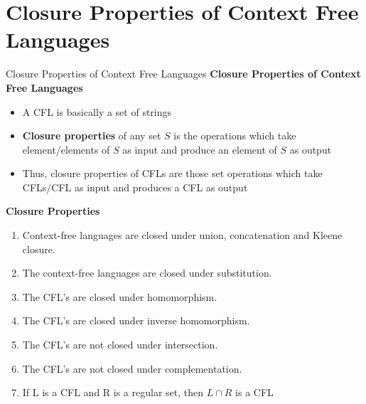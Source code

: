 \documentclass{beamer}
\begin{document}
		
\section{Closure Properties of Context Free Languages}
\begin{frame}{Closure Properties of Context Free Languages}
\textbf{Closure Properties of Context Free Languages}
\begin{itemize}
	\item A CFL is basically a set of strings
	\item \textbf{Closure properties} of any set $S$ is the operations which take element/elements of $S$ as input and produce an element of $S$ as output
	\item Thus, closure properties of CFLs are those set operations which take CFLs/CFL as input and produces a CFL as output
\end{itemize}
\textbf{Closure Properties}
\begin{enumerate}
	\item Context-free languages are closed under union, concatenation and 
	Kleene closure.
	\item The context-free languages are closed under substitution.
	\item The CFL’s are closed under homomorphism.
	\item The CFL’s are closed under inverse homomorphism.
	\item The CFL’s are not closed under intersection.
	\item The CFL’s are not closed under complementation.
	\item If L is a CFL and R is a regular set, then $L\cap R$ is a CFL
\end{enumerate}
\end{frame}
\end{document}
